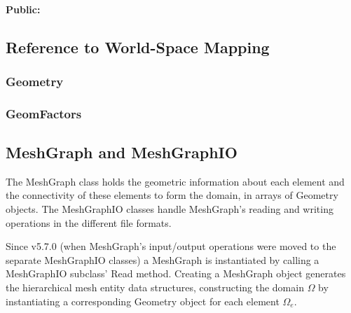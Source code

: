 \paragraph{Public:}



\subsection{Reference to World-Space Mapping}

\subsubsection{Geometry}


\subsubsection{GeomFactors}




\subsection{MeshGraph and MeshGraphIO}
The MeshGraph class holds the geometric information about each element and the connectivity of these elements to form the domain, in arrays of Geometry objects.
The MeshGraphIO classes handle MeshGraph's reading and writing operations in the different file formats.

Since v5.7.0 (when MeshGraph's input/output operations were moved to the separate MeshGraphIO classes) a MeshGraph is instantiated by calling a MeshGraphIO subclass' Read method.
Creating a MeshGraph object generates the hierarchical mesh entity data structures, constructing the domain $\Omega$ by instantiating a corresponding Geometry object for each element $\Omega_e$.